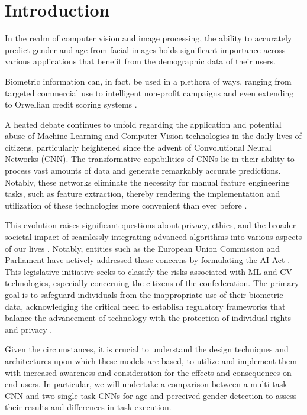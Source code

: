 \section{Introduction} \label{sec:introduction}
In the realm of computer vision and image processing,
the ability to accurately predict gender and age from facial
images holds significant importance across various applications that benefit
from the demographic data of their users.

Biometric information can, in fact, be used in a plethora of ways,
ranging from targeted commercial use \cite{int1} to intelligent non-profit campaigns \cite{int2}
and even extending to Orwellian credit scoring systems \cite{int3}.

A heated debate continues to unfold regarding the application
and potential abuse of Machine Learning and Computer Vision
technologies in the daily lives of citizens, particularly heightened
since the advent of Convolutional Neural Networks (CNN).
The transformative capabilities of CNNs lie in their ability to process
vast amounts of data and generate remarkably accurate predictions.
Notably, these networks eliminate the necessity for manual feature
engineering tasks, such as feature extraction, thereby rendering the
implementation and utilization of these technologies more convenient than
ever before \cite{int6}. 

This evolution raises significant questions about privacy, ethics, and
the broader societal impact of seamlessly integrating advanced algorithms
into various aspects of our lives \cite{int7}. 
Notably, entities such as the European Union Commission and Parliament
have actively addressed these concerns by formulating the AI Act \cite{int4}.
This legislative initiative seeks to classify the risks associated with
ML and CV technologies, especially concerning the citizens of the
confederation. The primary goal is to safeguard individuals
from the inappropriate use of their biometric data, acknowledging
the critical need to establish regulatory frameworks that balance
the advancement of technology with the protection of individual
rights and privacy  \cite{int5}.

Given the circumstances, it is crucial to understand the design
techniques and architectures upon which these models are based,
to utilize and implement them with increased awareness and
consideration for the effects and consequences on end-users.
In particular, we will undertake a comparison between a multi-task
CNN and two single-task CNNs for
age and perceived gender detection to assess their results and
differences in task execution.